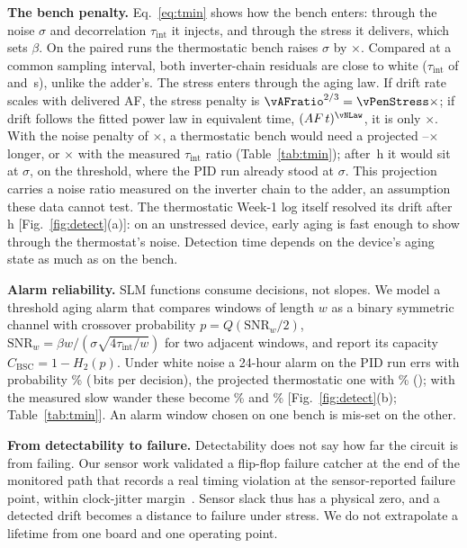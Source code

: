 \documentclass[10pt,twocolumn]{article}
\newcommand{\tint}{\tau_{\mathrm{int}}}
\begin{document}
\textbf{The bench penalty.} Eq.~\eqref{eq:tmin} shows how the bench enters: through the noise $\sigma$ and decorrelation $\tint$ it injects, and through the stress it delivers, which sets $\beta$. On the paired runs the thermostatic bench raises $\sigma$ by \vSigRawRatio$\times$. Compared at a common sampling interval, both inverter-chain residuals are close to white ($\tint$ of \vTauBBs{} and \vTauPIDs\,s), unlike the adder's. The stress enters through the aging law. If drift rate scales with delivered AF, the stress penalty is $\vAFratio^{2/3}=\vPenStress\times$; if drift follows the fitted power law in equivalent time, $(AF\,t)^{\vNLaw}$, it is only \vPenStressPow$\times$. With the noise penalty of \vPenNoiseSigOnly$\times$, a thermostatic bench would need a projected \vPenLow--\vPenMid$\times$ longer, or \vPenHigh$\times$ with the measured $\tint$ ratio (Table~\ref{tab:tmin}); after \vDurPairPost\,h it would sit at \vSeqZbb$\sigma$, on the threshold, where the PID run already stood at \vSeqZpid$\sigma$. This projection carries a noise ratio measured on the inverter chain to the adder, an assumption these data cannot test. The thermostatic Week-1 log itself resolved its drift after \vTminSeqBBlong\,h [Fig.~\ref{fig:detect}(a)]: on an unstressed device, early aging is fast enough to show through the thermostat's noise. Detection time depends on the device's aging state as much as on the bench.

\textbf{Alarm reliability.} SLM functions consume decisions, not slopes. We model a threshold aging alarm that compares windows of length $w$ as a binary symmetric channel with crossover probability $p=Q(\mathrm{SNR}_w/2)$, $\mathrm{SNR}_w=\beta w/(\sigma\sqrt{4\tint/w})$ for two adjacent windows, and report its capacity $C_{\mathrm{BSC}}=1-H_2(p)$. Under white noise a 24-hour alarm on the PID run errs with probability \vPerrPidBound\% (\vCpidBound\,bits per decision), the projected thermostatic one with \vPerrBbBound\% (\vCbbBound); with the measured slow wander these become \vPerrPidLrv\% and \vPerrBbLrv\% [Fig.~\ref{fig:detect}(b); Table~\ref{tab:tmin}]. An alarm window chosen on one bench is mis-set on the other.

\textbf{From detectability to failure.} Detectability does not say how far the circuit is from failing. Our sensor work validated a flip-flop failure catcher at the end of the monitored path that records a real timing violation at the sensor-reported failure point, within clock-jitter margin~\cite{sbcci25}. Sensor slack thus has a physical zero, and a detected drift becomes a distance to failure under stress. We do not extrapolate a lifetime from one board and one operating point.
\end{document}
